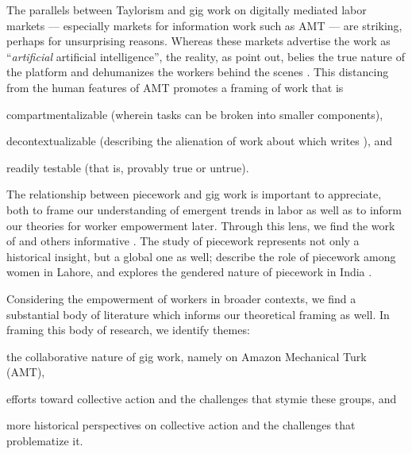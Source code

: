 \documentclass[11pt]{article}
\makeatletter
\newcounter{countitems}
\newcounter{nextitemizecount}
\newcommand{\nextitemizecount}{%
  \getrefnumber{countitems@\number\c@nextitemizecount}%
}
\makeatother
\begin{document}
The parallels between Taylorism and gig work on digitally mediated labor markets
--- especially markets for information work such as AMT ---
are striking, perhaps for unsurprising reasons.
Whereas these markets advertise the work as
``\textit{artificial} artificial intelligence'',
the reality, as
\citeauthor{turkopticon}
point out,
belies the true nature of the platform and dehumanizes the workers behind the scenes
\citep{turkopticon}.
This distancing from the human features of AMT promotes a framing of work that is
\begin{inlinelist}
  \item compartmentalizable (wherein tasks can be broken into smaller components),
  \item decontextualizable (describing the alienation of work about which
  \citeauthor{marx2012economic}
  writes
  \citep{marx2012economic}), and
  \item readily testable (that is, provably true or untrue).
\end{inlinelist}

The relationship between piecework and gig work is important to appreciate, both
to frame our understanding of emergent trends in labor
as well as
to inform our theories for worker empowerment later.
Through this lens, we find the work of
\citeauthor{riisOtherSideLives}
and others informative
\citep{riisOtherSideLives,gringeri1994getting,herzog1980hand}.
The study of piecework represents not only a historical insight,
but a global one as well;
\citeauthor{shaheed1983invisible}
describe the role of piecework among women in Lahore,
and
\citeauthor{hahn1996feminization}
explores the gendered nature of piecework in India
\citep{shaheed1983invisible,hahn1996feminization}.

Considering the empowerment of workers in broader contexts,
we find a substantial body of literature which informs our theoretical framing as well.
In framing this body of research,
we identify \nextitemizecount{} themes:
\begin{inlinelist}
  \item the collaborative nature of gig work, namely on Amazon Mechanical Turk (AMT),
  \item efforts toward collective action and the challenges that stymie these groups, and
  \item more historical perspectives on collective action and the challenges that problematize it.
\end{inlinelist}
\end{document}
